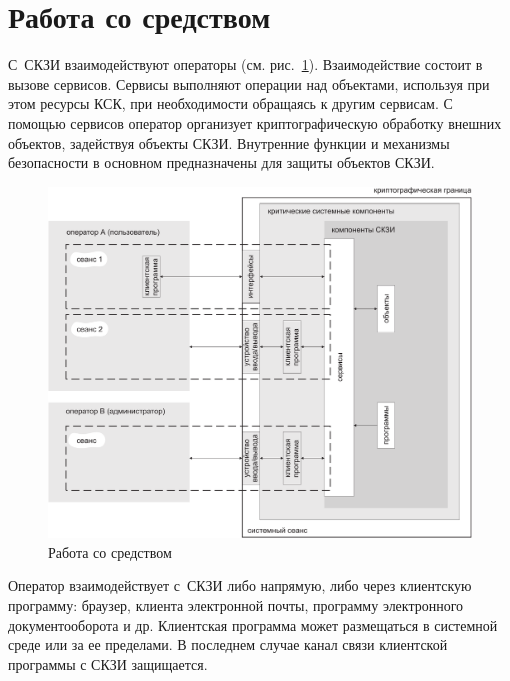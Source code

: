 \section{Работа со средством}\label{COMMON.Overview}


С~СКЗИ взаимодействуют операторы (см. рис.~\ref{Fig.COMMON.Sessions}).
%
Взаимодействие состоит в вызове сервисов.
%
Сервисы выполняют операции над объектами, используя при этом ресурсы КСК,
при необходимости обращаясь к другим сервисам.
%
С помощью сервисов оператор организует криптографическую
обработку внешних объектов, задействуя объекты СКЗИ.
%
Внутренние функции и механизмы безопасности в основном предназначены
для защиты объектов СКЗИ.

\begin{figure}[bht]
\begin{center}
\includegraphics[width=16.5cm]{../figs/sessions}
\end{center}
\caption{Работа со средством}\label{Fig.COMMON.Sessions}
\end{figure}


Оператор взаимодействует с~СКЗИ либо напрямую, 
либо через клиентскую программу: браузер, клиента электронной почты, 
программу электронного документооборота и др.
%
Клиентская программа может размещаться в системной среде или за ее пределами. 
%
В последнем случае канал связи клиентской программы с СКЗИ защищается. 

